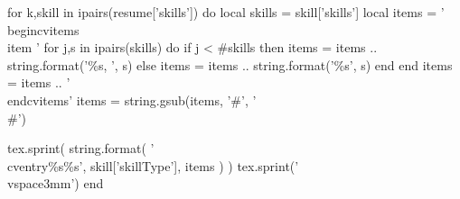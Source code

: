 

\begin{cventries}



  \begin{luacode}
    for k,skill in ipairs(resume['skills']) do
      local skills = skill['skills']
      local items = '\\begin{cvitems}\\item {'
        for j,s in ipairs(skills) do
        if j < #skills then
          items = items .. string.format('\%s, ', s)
        else
          items = items .. string.format('\%s', s)
        end
      end
      items = items .. '}\\end{cvitems}'
      items = string.gsub(items, '\#', '\\\#')

      tex.sprint(
        string.format(
          '\\cventry{\%s}{}{}{}{\%s}',
          skill['skillType'],
          items
        )
      )
      tex.sprint('\\vspace{3mm}')
    end
  \end{luacode}



\end{cventries}

